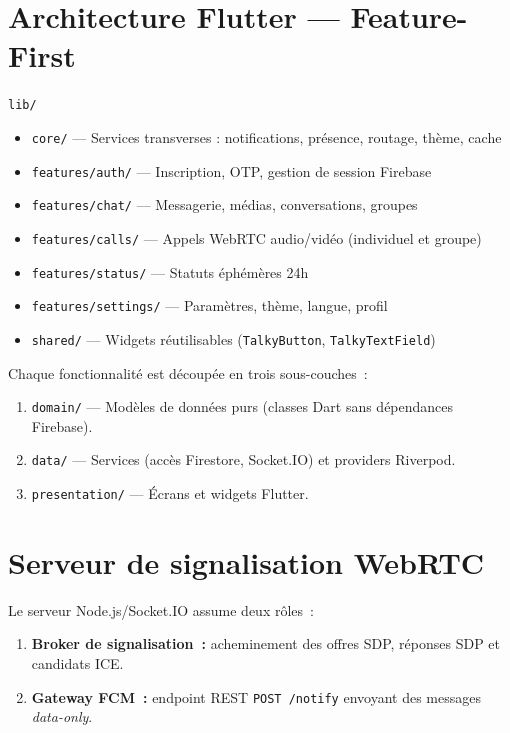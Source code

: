 \documentclass[12pt,a4paper]{report}
\begin{document}
\section{Architecture Flutter --- Feature-First}

\begin{infobox}
\texttt{lib/}
\begin{itemize}[noitemsep]
  \item \texttt{core/} --- Services transverses : notifications, présence, routage, thème, cache
  \item \texttt{features/auth/} --- Inscription, OTP, gestion de session Firebase
  \item \texttt{features/chat/} --- Messagerie, médias, conversations, groupes
  \item \texttt{features/calls/} --- Appels WebRTC audio/vidéo (individuel et groupe)
  \item \texttt{features/status/} --- Statuts éphémères 24h
  \item \texttt{features/settings/} --- Paramètres, thème, langue, profil
  \item \texttt{shared/} --- Widgets réutilisables (\texttt{TalkyButton}, \texttt{TalkyTextField})
\end{itemize}
\end{infobox}

Chaque fonctionnalité est découpée en trois sous-couches~:
\begin{enumerate}
  \item \texttt{domain/} --- Modèles de données purs (classes Dart sans dépendances Firebase).
  \item \texttt{data/} --- Services (accès Firestore, Socket.IO) et providers Riverpod.
  \item \texttt{presentation/} --- Écrans et widgets Flutter.
\end{enumerate}

\section{Serveur de signalisation WebRTC}

Le serveur Node.js/Socket.IO assume deux rôles~:
\begin{enumerate}
  \item \textbf{Broker de signalisation~:} acheminement des offres SDP, réponses SDP et candidats ICE.
  \item \textbf{Gateway FCM~:} endpoint REST \texttt{POST /notify} envoyant des messages \textit{data-only}.
\end{enumerate}
\end{document}
